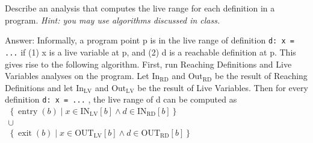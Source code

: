\begin{problem}
Describe an analysis that computes the live range for each definition in a program. \emph{Hint: you may use algorithms discussed in class.}

\item Answer:
{\color{red}Informally, a program point p is in the live range of definition \texttt{d: x = ...} if (1) x is a live
variable at p, and (2) d is a reachable definition at p. This gives rise to the following algorithm.
First, run Reaching Definitions and Live Variables analyses on the program. Let $\mathrm{In}_\mathrm{RD}$ and
$\mathrm{Out}_\mathrm{RD}$ be the result of Reaching Definitions and let $\mathrm{In}_\mathrm{LV}$ and $\mathrm{Out}_\mathrm{LV}$ be the result of Live
Variables. Then for every definition \texttt{d: x = ...} , the live range of d can be computed as \\
$\begin{gathered}\left\{\operatorname{entry}(b) \mid x \in \mathrm{IN}_{\mathrm{LV}}[b] \wedge d \in \mathrm{IN}_{\mathrm{RD}}[b]\right\} \\ \cup \\ \left\{\operatorname{exit}(b) \mid x \in \mathrm{OUT}_{\mathrm{LV}}[b] \wedge d \in \mathrm{OUT}_{\mathrm{RD}}[b]\right\}\end{gathered}$}
\end{problem}


